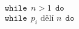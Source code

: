 \documentclass[preview]{standalone}
\begin{document}
\begin{align*}
\mathtt{while}  \:\: n > 1 \:\:  \mathtt{do}  \\ \mathtt{while}  \:\: p_i \text{ dělí } n \:\:  \mathtt{do}
\end{align*}
\end{document}
